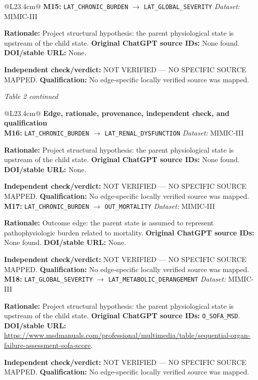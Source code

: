 \begin{tabular}{@{}L{23.4cm}@{}}
\addlinespace[2pt]
\midrule
\textbf{M15:} \nolinkurl{LAT_CHRONIC_BURDEN} $\rightarrow$ \nolinkurl{LAT_GLOBAL_SEVERITY} \hfill \textit{Dataset:} MIMIC-III\par\textbf{Rationale:} Project structural hypothesis: the parent physiological state is upstream of the child state. \textbf{Original ChatGPT source IDs:} None found. \textbf{DOI/stable URL:} None.\par\textbf{Independent check/verdict:} NOT VERIFIED --- NO SPECIFIC SOURCE MAPPED. \textbf{Qualification:} No edge-specific locally verified source was mapped. \\
\addlinespace[2pt]
\midrule
\bottomrule
\end{tabular}
\clearpage
\textit{Table 2 continued}\par
\begin{tabular}{@{}L{23.4cm}@{}}
\toprule
\textbf{Edge, rationale, provenance, independent check, and qualification}\\
\midrule
\textbf{M16:} \nolinkurl{LAT_CHRONIC_BURDEN} $\rightarrow$ \nolinkurl{LAT_RENAL_DYSFUNCTION} \hfill \textit{Dataset:} MIMIC-III\par\textbf{Rationale:} Project structural hypothesis: the parent physiological state is upstream of the child state. \textbf{Original ChatGPT source IDs:} None found. \textbf{DOI/stable URL:} None.\par\textbf{Independent check/verdict:} NOT VERIFIED --- NO SPECIFIC SOURCE MAPPED. \textbf{Qualification:} No edge-specific locally verified source was mapped. \\
\addlinespace[2pt]
\midrule
\textbf{M17:} \nolinkurl{LAT_CHRONIC_BURDEN} $\rightarrow$ \nolinkurl{OUT_MORTALITY} \hfill \textit{Dataset:} MIMIC-III\par\textbf{Rationale:} Outcome edge: the parent state is assumed to represent pathophysiologic burden related to mortality. \textbf{Original ChatGPT source IDs:} None found. \textbf{DOI/stable URL:} None.\par\textbf{Independent check/verdict:} NOT VERIFIED --- NO SPECIFIC SOURCE MAPPED. \textbf{Qualification:} No edge-specific locally verified source was mapped. \\
\addlinespace[2pt]
\midrule
\textbf{M18:} \nolinkurl{LAT_GLOBAL_SEVERITY} $\rightarrow$ \nolinkurl{LAT_METABOLIC_DERANGEMENT} \hfill \textit{Dataset:} MIMIC-III\par\textbf{Rationale:} Project structural hypothesis: the parent physiological state is upstream of the child state. \textbf{Original ChatGPT source IDs:} \nolinkurl{O_SOFA_MSD}. \textbf{DOI/stable URL:} \url{https://www.msdmanuals.com/professional/multimedia/table/sequential-organ-failure-assessment-sofa-score}.\par\textbf{Independent check/verdict:} NOT VERIFIED --- NO SPECIFIC SOURCE MAPPED. \textbf{Qualification:} No edge-specific locally verified source was mapped. \\

\end{tabular}
